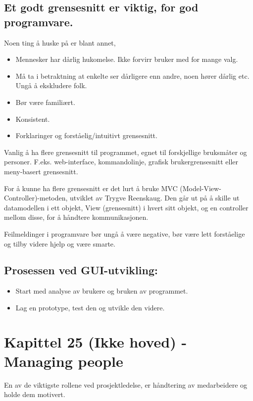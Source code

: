 \documentclass[11pt]{article}
\begin{document}
\subsection{Et godt grensesnitt er viktig, for god programvare.}
\label{sec-14.1}

   Noen ting å huske på er blant annet,

\begin{itemize}
\item Mennesker har dårlig hukomelse. Ikke forvirr bruker med for mange valg.
\item Må ta i betraktning at enkelte ser dårligere enn andre, noen hører dårlig etc. Ungå å ekskludere folk.
\item Bør være familiært.
\item Konsistent.
\item Forklaringer og forståelig/intuitivt grensesnitt.
\end{itemize}

  Vanlig å ha flere grensesnitt til programmet, 
  egnet til forskjellige bruksmåter og personer. F.eks. web-interface, 
  kommandolinje, grafisk brukergrensesnitt eller meny-basert grensesnitt.

  For å kunne ha flere grensesnitt er det lurt å bruke MVC (Model-View-Controller)-metoden, utviklet av Trygve Reenskaug. 
  Den går ut på å skille ut datamodellen i ett objekt, View (grensesnitt) i hvert sitt objekt, 
  og en controller mellom disse, for å håndtere kommunikasjonen.

  Feilmeldinger i programvare bør ungå å være negative, bør være lett forståelige og tilby videre hjelp og være smarte.
\subsection{Prosessen ved GUI-utvikling:}
\label{sec-14.2}

\begin{itemize}
\item Start med analyse av brukere og bruken av programmet.
\item Lag en prototype, test den og utvikle den videre.
\end{itemize}
\section{Kapittel 25 (Ikke hoved) - Managing people}
\label{sec-15}

  En av de viktigste rollene ved prosjektledelse, er håndtering av medarbeidere og holde dem motivert.
\end{document}
